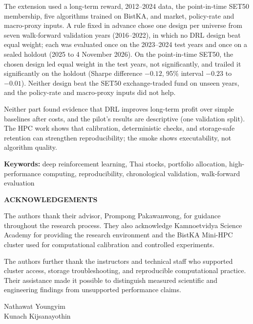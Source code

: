 \documentclass[12pt,a4paper,oneside]{book}
\newcommand{\ProjectAuthorOne}{Nathawat Youngyim}
\newcommand{\ProjectAuthorTwo}{Kunach Kijsanayothin}
\newcommand{\AdvisorName}{Prompong Pakawanwong}
\begin{document}
The extension used a long-term reward, 2012--2024 data, the point-in-time SET50 membership, five algorithms trained on BistKA, and market, policy-rate and macro-proxy inputs. A rule fixed in advance chose one design per universe from seven walk-forward validation years (2016--2022), in which no DRL design beat equal weight; each was evaluated once on the 2023--2024 test years and once on a sealed holdout (2025 to 4 November 2026). On the point-in-time SET50, the chosen design led equal weight in the test years, not significantly, and trailed it significantly on the holdout (Sharpe difference $-0.12$, 95\% interval $-0.23$ to $-0.01$). Neither design beat the SET50 exchange-traded fund on unseen years, and the policy-rate and macro-proxy inputs did not help.

Neither part found evidence that DRL improves long-term profit over simple baselines after costs, and the pilot's results are descriptive (one validation split). The HPC work shows that calibration, deterministic checks, and storage-safe retention can strengthen reproducibility; the smoke shows executability, not algorithm quality.

\par\medskip
\noindent\begin{minipage}{\textwidth}
\small\textbf{Keywords:} deep reinforcement learning, Thai stocks, portfolio allocation, high-performance computing, reproducibility, chronological validation, walk-forward evaluation
\end{minipage}

\newpage
\begin{center}
  \large\textbf{ACKNOWLEDGEMENTS}
\end{center}

The authors thank their advisor, \AdvisorName, for guidance throughout the research process. They also acknowledge Kamnoetvidya Science Academy for providing the research environment and the BistKA Mini-HPC cluster used for computational calibration and controlled experiments.

The authors further thank the instructors and technical staff who supported cluster access, storage troubleshooting, and reproducible computational practice. Their assistance made it possible to distinguish measured scientific and engineering findings from unsupported performance claims.

\vfill
\begin{flushright}
\ProjectAuthorOne\\
\ProjectAuthorTwo
\end{flushright}
\end{document}
